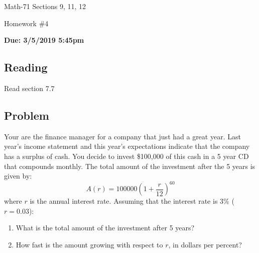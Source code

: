 \documentclass[letterpaper,12pt,fleqn]{article}
\begin{document}
\begin{center}
  \large
  Math-71 Sections 9, 11, 12

  \Large
  Homework \#4

  \large
  \textbf{Due: 3/5/2019 5:45pm}
\end{center}

\subsection*{Reading}

Read section 7.7

\subsection*{Problem}

Your are the finance manager for a company that just had a great year.  Last year's income statement and this year's
expectations indicate that the company has a surplus of cash.  You decide to invest \$100,000 of this cash in a 5 year CD that
compounds monthly.  The total amount of the investment after the 5 years is given by:
\[A(r)=100000\left(1+\frac{r}{12}\right)^{60}\]
where \(r\) is the annual interest rate. Assuming that the interest rate is 3\% (\(r=0.03\)):
\begin{enumerate}
\item What is the total amount of the investment after 5 years?
\item How fast is the amount growing with respect to \(r\), in dollars per percent?
\end{enumerate}
\end{document}
